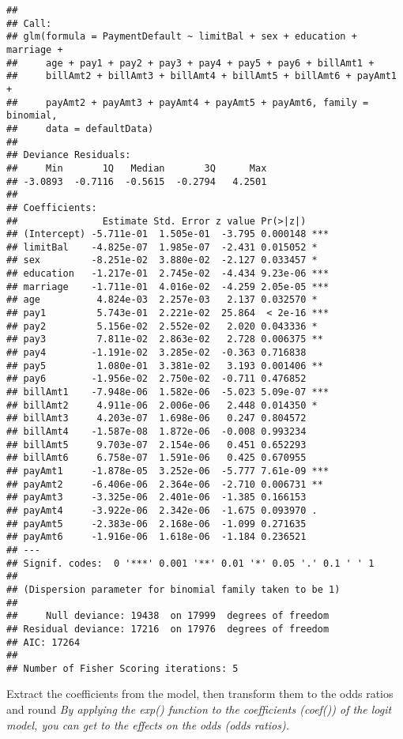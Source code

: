 \documentclass[
]{article}
\begin{document}
\begin{verbatim}
## 
## Call:
## glm(formula = PaymentDefault ~ limitBal + sex + education + marriage + 
##     age + pay1 + pay2 + pay3 + pay4 + pay5 + pay6 + billAmt1 + 
##     billAmt2 + billAmt3 + billAmt4 + billAmt5 + billAmt6 + payAmt1 + 
##     payAmt2 + payAmt3 + payAmt4 + payAmt5 + payAmt6, family = binomial, 
##     data = defaultData)
## 
## Deviance Residuals: 
##     Min       1Q   Median       3Q      Max  
## -3.0893  -0.7116  -0.5615  -0.2794   4.2501  
## 
## Coefficients:
##               Estimate Std. Error z value Pr(>|z|)    
## (Intercept) -5.711e-01  1.505e-01  -3.795 0.000148 ***
## limitBal    -4.825e-07  1.985e-07  -2.431 0.015052 *  
## sex         -8.251e-02  3.880e-02  -2.127 0.033457 *  
## education   -1.217e-01  2.745e-02  -4.434 9.23e-06 ***
## marriage    -1.711e-01  4.016e-02  -4.259 2.05e-05 ***
## age          4.824e-03  2.257e-03   2.137 0.032570 *  
## pay1         5.743e-01  2.221e-02  25.864  < 2e-16 ***
## pay2         5.156e-02  2.552e-02   2.020 0.043336 *  
## pay3         7.811e-02  2.863e-02   2.728 0.006375 ** 
## pay4        -1.191e-02  3.285e-02  -0.363 0.716838    
## pay5         1.080e-01  3.381e-02   3.193 0.001406 ** 
## pay6        -1.956e-02  2.750e-02  -0.711 0.476852    
## billAmt1    -7.948e-06  1.582e-06  -5.023 5.09e-07 ***
## billAmt2     4.911e-06  2.006e-06   2.448 0.014350 *  
## billAmt3     4.203e-07  1.698e-06   0.247 0.804572    
## billAmt4    -1.587e-08  1.872e-06  -0.008 0.993234    
## billAmt5     9.703e-07  2.154e-06   0.451 0.652293    
## billAmt6     6.758e-07  1.591e-06   0.425 0.670955    
## payAmt1     -1.878e-05  3.252e-06  -5.777 7.61e-09 ***
## payAmt2     -6.406e-06  2.364e-06  -2.710 0.006731 ** 
## payAmt3     -3.325e-06  2.401e-06  -1.385 0.166153    
## payAmt4     -3.922e-06  2.342e-06  -1.675 0.093970 .  
## payAmt5     -2.383e-06  2.168e-06  -1.099 0.271635    
## payAmt6     -1.916e-06  1.618e-06  -1.184 0.236521    
## ---
## Signif. codes:  0 '***' 0.001 '**' 0.01 '*' 0.05 '.' 0.1 ' ' 1
## 
## (Dispersion parameter for binomial family taken to be 1)
## 
##     Null deviance: 19438  on 17999  degrees of freedom
## Residual deviance: 17216  on 17976  degrees of freedom
## AIC: 17264
## 
## Number of Fisher Scoring iterations: 5
\end{verbatim}

Extract the coefficients from the model, then transform them to the odds
ratios and round \emph{By applying the exp() function to the
coefficients (coef()) of the logit model, you can get to the effects on
the odds (odds ratios).}
\end{document}
